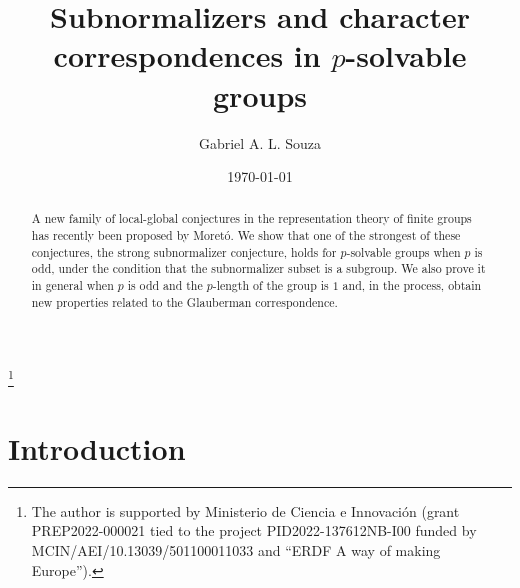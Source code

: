 \documentclass[12pt]{amsart}
\theoremstyle{remark}
\theoremstyle{definition}
\theoremstyle{plain}
\theoremstyle{definition}
\numberwithin{equation}{section}
\begin{document}
\title[Subnormalizers and character correspondences in $p$-solvable groups]{Subnormalizers and character correspondences in $p$-solvable groups}



\author{Gabriel A. L. Souza}
\address{Departament de Matemàtiques, Universitat de València, 46100 Burjassot, València, Spain}


\thanks{The author is supported by Ministerio de Ciencia e Innovación (grant PREP2022-000021 tied to the project PID2022-137612NB-I00 funded by MCIN/AEI/10.13039/501100011033 and ``ERDF A way of making Europe'').}



\date{\today}


\begin{abstract}
	A new family of local-global conjectures in the representation theory of finite groups has recently been proposed by Moretó. We show that one of the strongest of these conjectures, the strong subnormalizer conjecture, holds for $p$-solvable groups when $p$ is odd, under the condition that the subnormalizer subset is a subgroup. We also prove it in general when $p$ is odd and the $p$-length of the group is $1$ and, in the process, obtain new properties related to the Glauberman correspondence.
\end{abstract}

\maketitle


\section{Introduction}
\end{document}
